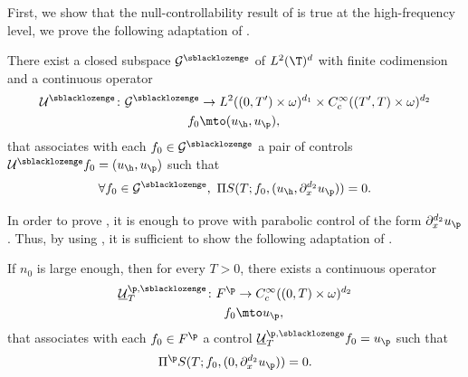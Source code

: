 First, we show that the null-controllability result of  is true at the high-frequency level, \ie we prove the following adaptation of .
\begin{prop}
\label{PropControlHighFreqd_x}
There exist a closed subspace $\mathcal{G}^{\sblacklozenge}$ of $L^2(\T)^{d}$ with finite codimension and a continuous operator
\begin{align*}
\mathcal{U}^{\sblacklozenge} \colon
\mathcal{G}^{\sblacklozenge} &\to L^2((0,T')\times\omega)^{d_1} \times C^\infty_c((T',T)\times\omega)^{d_2}\\
f_0 &\mto (u_{\h},u_{\p}),
\end{align*}
that associates with each $f_0 \in \mathcal{G}^{\sblacklozenge} $ a pair of controls $\mathcal{U}^{\sblacklozenge} f_{0}=(u_{\h},u_{\p})$ such that
\begin{equation}
\label{PropKd_x}
\forall f_0 \in \mathcal{G}^{\sblacklozenge},\ \Pi S(T;f_0, (u_{\h},\partial_{x}^{d_2}u_{\p})) = 0.
\end{equation}
\end{prop}
In order to prove , it is enough to prove  with
parabolic control of the form $\partial_{x}^{d_2} u_{\p}$. Thus, by using
, it is sufficient to show the following adaptation of
.
\begin{prop}
\label{LemPar_Bisd_x}
If $n_0$ is large enough, then for every $T>0$, there exists a continuous operator
\begin{align*}
\underline{\mathcal{U}}_T^{\p,\sblacklozenge} \colon
F^\p & \to C^\infty_c((0,T)\times\omega)^{d_2} \\
f_0 &\mto u_{\p},
\end{align*}
that associates with each $f_0 \in F^{\p} $ a control $\underline{\mathcal{U}}_T^{\p,\sblacklozenge} f_{0}=u_{\p}$ such that
\begin{equation*}
\Pi^{\p} S(T; f_0, (0, \partial_{x}^{d_2}u_{\p})) = 0.
\end{equation*}
\end{prop}
